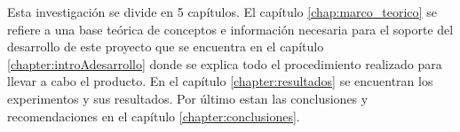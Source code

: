 


Esta investigaci\'on se divide en 5 cap\'itulos. El cap\'itulo \ref{chap:marco_teorico} se refiere a una base te\'orica de conceptos e informaci\'on necesaria para el soporte del desarrollo de este proyecto que se encuentra en el cap\'itulo  \ref{chapter:introAdesarrollo} donde se explica todo el procedimiento realizado para llevar a cabo el producto. En el cap\'itulo \ref{chapter:resultados} se encuentran  los experimentos y sus resultados. Por \'ultimo estan las conclusiones y recomendaciones en el capítulo \ref{chapter:conclusiones}. 
